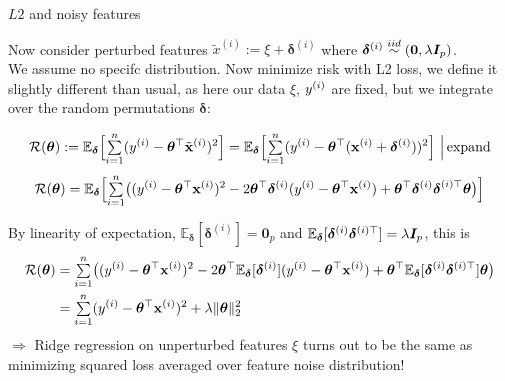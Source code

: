 \documentclass[11pt,compress,t,notes=noshow, xcolor=table]{beamer}
\begin{document}
\begin{vbframe}{$L2$ and noisy features}
\begin{footnotesize}
Now consider perturbed features $ \tilde{x}^{(i)}:= \xi + \bm{\delta}^{(i)}$ where $\bm{\delta}^{(i)} \overset{iid}{\sim} (\bm{0},\lambda \bm{I}_p)$. \\
We assume no specifc distribution. Now minimize risk with L2 loss, we define it slightly different than usual, as here our data $\xi$, $y^{(i)}$ are fixed, but we integrate over the random permutations $\bm{\delta}$:


$$\mathcal{R}(\bm{\theta}):= \mathbb{E}_{\bm{\delta}}\Big[{\textstyle \sum\limits_{i=1}^n}(y^{(i)}-\bm{\theta}^{\top}\tilde{\mathbf{x}}^{(i)})^2\Big] = \mathbb{E}_{\bm{\delta}}\Big[{\textstyle \sum\limits_{i=1}^n}(y^{(i)}-\bm{\theta}^{\top}(\mathbf{x}^{(i)}+\bm{\delta}^{(i)}))^2\Big]\,\,\Big|\, \text{expand}$$
\vspace{-0.2cm}
$$\mathcal{R}(\bm{\theta}) = \mathbb{E}_{\bm{\delta}}\Big[{\textstyle \sum\limits_{i=1}^n}\big((y^{(i)}-\bm{\theta}^{\top}\mathbf{x}^{(i)})^2 - 2 \bm{\theta}^{\top}\bm{\delta}^{(i)}(y^{(i)}-\bm{\theta}^{\top}\mathbf{x}^{(i)}) + \bm{\theta}^{\top}\bm{\delta}^{(i)}\bm{{\delta}}^{(i) \top}\bm{\theta}\big)\Big]$$

By linearity of expectation, $\mathbb{E}_{\bm{\delta}}[\bm{\delta}^{(i)}]=\bm{0}_p$ and $\mathbb{E}_{\bm{\delta}}[\bm{\delta}^{(i)}\bm{\delta}^{(i)\top}]=\lambda \bm{I}_p$, this is
\vspace{-0.2cm}
%
\begin{align*}\mathcal{R}(\bm{\theta})&={\textstyle \sum\limits_{i=1}^n}\big((y^{(i)}-\bm{\theta}^{\top}\mathbf{x}^{(i)})^2 - 2 \bm{\theta}^{\top}\mathbb{E}_{\bm{\delta}}[\bm{\delta}^{(i)}](y^{(i)}-\bm{\theta}^{\top}\mathbf{x}^{(i)}) + \bm{\theta}^{\top}\mathbb{E}_{\bm{\delta}}[\bm{\delta}^{(i)}\bm{\delta}^{(i)\top}]\bm{\theta} \big) \\
&= {\textstyle \sum\limits_{i=1}^n}(y^{(i)}-\bm{\theta}^{\top}\mathbf{x}^{(i)})^2+\lambda \Vert \bm{\theta} \Vert_2^2
\end{align*}
$\Longrightarrow$ Ridge regression on unperturbed features {\small $\xi$} turns out to be the same as minimizing squared loss averaged over feature noise distribution!

\end{footnotesize}

\end{vbframe}



\endlecture
\end{document}
